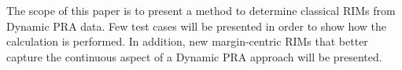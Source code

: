 The scope of this paper is to present a method to determine classical RIMs from Dynamic PRA 
data. Few test cases will be presented in order to show how the calculation is performed. 
In addition, new margin-centric RIMs that better capture the continuous aspect of a Dynamic 
PRA approach will be presented.


